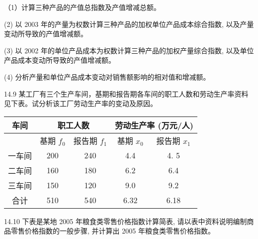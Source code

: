 \documentclass[10pt]{article}
\begin{document}
\begin{CJK*}{UTF8}{bsmi}
（1）计算三种产品的产值总指数及产值增减总额。

(2) 以 2003 年的产量为权数计算三种产品的加权单位产品成本综合指数, 以及产量变动所导致的产值增减额。

(3) 以 2002 年的单位产品成本为权数计算三种产品的加权产量综合指数, 以及单位产品成本变动所导致的产值增减额。

(4) 分析产量和单位产品成本变动对销售额影响的相对值和增减额。

14.9 某工厂有三个生产车间，基期和报告期各车间的职工人数和劳动生产率资料见下表。试分析该工厂劳动生产率的变动及原因。

\begin{center}
\begin{tabular}{|c|c|c|c|c|}
\hline
\multirow{2}{*}{车间} & \multicolumn{2}{|c|}{职工人数} & \multicolumn{2}{|c|}{劳动生产率 (万元/人)} \\
\hline
 & 基期 $f_{0}$ & 报告期 $f_{1}$ & 基期 $x_{0}$ & 报告期 $x_{1}$ \\
\hline
一车间 & 200 & 240 & 4.4 & 4. 5 \\
\hline
二车间 & 160 & 180 & 6.2 & 6.4 \\
\hline
三车间 & 150 & 120 & 9.0 & 9.2 \\
\hline
合计 & 510 & 540 & 6.32 & 6.18 \\
\hline
\end{tabular}
\end{center}

14.10 下表是某地 2005 年粮食类零售价格指数计算简表, 请以表中资料说明编制商品零售价格指数的一般步骤, 并计算出 2005 年粮食类零售价格指数。


\end{CJK*}
\end{document}
